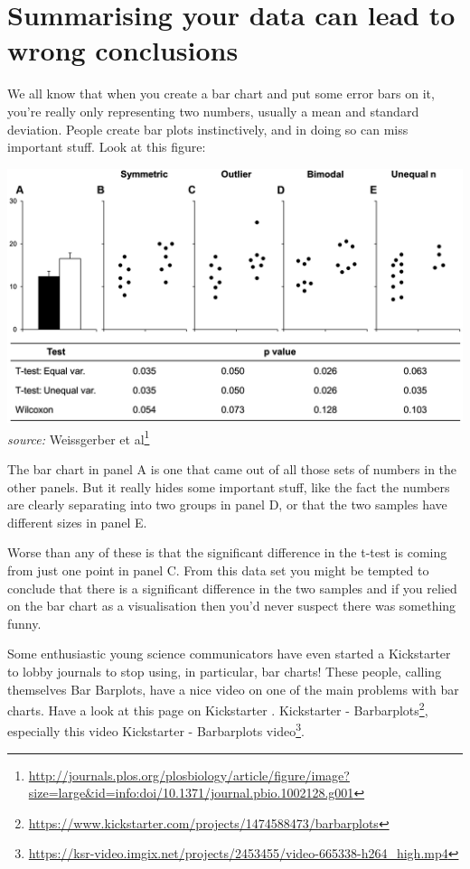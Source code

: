\documentclass[
]{book}
\renewcommand{\href}[2]{#2\footnote{\url{#1}}}
\begin{document}
\hypertarget{summarising-your-data-can-lead-to-wrong-conclusions}{%
\section{Summarising your data can lead to wrong conclusions}\label{summarising-your-data-can-lead-to-wrong-conclusions}}

We all know that when you create a bar chart and put some error bars on it, you're really only representing two numbers, usually a mean and standard deviation. People create bar plots instinctively, and in doing so can miss important stuff. Look at this figure:

\includegraphics{fig/barplots.png}
\emph{source:} \href{http://journals.plos.org/plosbiology/article/figure/image?size=large\&id=info:doi/10.1371/journal.pbio.1002128.g001}{Weissgerber et al}

The bar chart in panel A is one that came out of all those sets of numbers in the other panels. But it really hides some important stuff, like the fact the numbers are clearly separating into two groups in panel D, or that the two samples have different sizes in panel E.

Worse than any of these is that the significant difference in the t-test is coming from just one point in panel C. From this data set you might be tempted to conclude that there is a significant difference in the two samples and if you relied on the bar chart as a visualisation then you'd never suspect there was something funny.

Some enthusiastic young science communicators have even started a Kickstarter to lobby journals to stop using, in particular, bar charts! These people, calling themselves Bar Barplots, have a nice video on one of the main problems with bar charts. Have a look at this page on Kickstarter . \href{https://www.kickstarter.com/projects/1474588473/barbarplots}{Kickstarter - Barbarplots}, especially this video \href{https://ksr-video.imgix.net/projects/2453455/video-665338-h264_high.mp4}{Kickstarter - Barbarplots video}.
\end{document}
